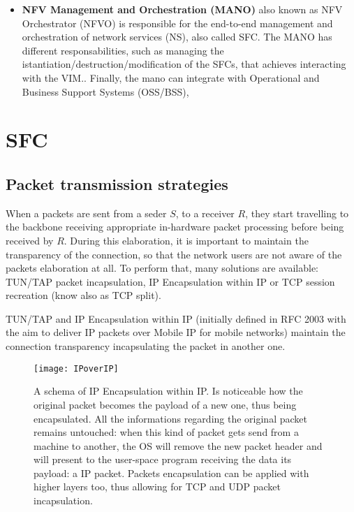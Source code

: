 \begin{itemize}
\item \textbf{NFV Management and Orchestration (MANO)} also known as NFV
  Orchestrator (NFVO) is responsible for the end-to-end management and
  orchestration of network services (NS), also called SFC. The MANO has
  different responsabilities, such as managing the
  istantiation/destruction/modification of the SFCs, that achieves interacting
  with the VIM.. Finally, the mano can integrate with 
Operational and Business Support Systems (OSS/BSS), 

\end{itemize}


\section{SFC}


\subsection{Packet transmission strategies}

When a packets are sent from a seder $S$, to a receiver $R$, they start
travelling to the backbone receiving appropriate in-hardware packet processing
before being received by $R$. During this elaboration, it is important to
maintain the transparency of the connection, so that the network users are not
aware of the packets elaboration at all. To perform that, many solutions are
available: TUN/TAP packet incapsulation, IP Encapsulation within IP or TCP
session recreation (know also as TCP split).

TUN/TAP and IP Encapsulation within IP (initially defined in RFC 2003 with the
aim to deliver IP packets over Mobile IP for mobile networks) maintain the
connection transparency incapsulating the packet in another one.
\begin{figure}[t]
  \centering \texttt{[image: IPoverIP]}
  \caption[IP Encapsulation within IP packet schema]{A schema of IP
    Encapsulation within IP. Is noticeable how the original packet becomes the
    payload of a new one, thus being encapsulated. All the informations
    regarding the original packet remains untouched: when this kind of packet
    gets send from a machine to another, the OS will remove the new packet
    header and will present to the user-space program receiving the data its
    payload: a IP packet. Packets encapsulation can be applied with higher
    layers too, thus allowing for TCP and UDP packet incapsulation.}
  \label{chap:prjan:img:ip_over_ip}
\end{figure}


